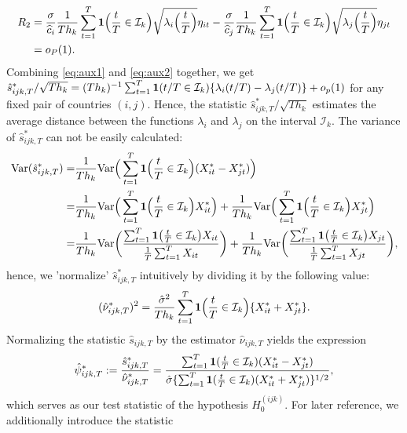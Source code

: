 \documentclass[a4paper,12pt]{article}
\numberwithin{equation}{section}
\begin{document}
{\begin{align}\label{eq:aux2}
R_2& =  \frac{\sigma}{\widehat{c}_i} \frac{1}{Th_k} \sum\limits_{t=1}^T \boldsymbol{1}\Big(\frac{t}{T} \in \mathcal{I}_k\Big) \sqrt{\lambda_i\Big(\frac{t}{T}\Big)} \eta_{it} -\frac{\sigma}{\widehat{c}_j}\frac{1}{Th_k} \sum\limits_{t=1}^T \boldsymbol{1}\Big(\frac{t}{T} \in \mathcal{I}_k\Big)  \sqrt{\lambda_j\Big(\frac{t}{T}\Big)} \eta_{jt}\nonumber\\
& = o_P(1).
\end{align}
Combining \eqref{eq:aux1} and \eqref{eq:aux2} together, we get $\hat{s}^*_{ijk,T}/\sqrt{Th_k} = (Th_k)^{-1} \sum_{t=1}^T \boldsymbol{1}(t/T \in \mathcal{I}_k) \{\lambda_i(t/T) - \lambda_j(t/T)\} + o_p(1)$ for any fixed pair of countries $(i,j)$. Hence, the statistic $\hat{s}^*_{ijk,T}/\sqrt{Th_k}$ estimates the average distance between the functions $\lambda_i$ and $\lambda_j$ on the interval $\mathcal{I}_k$. The variance of $\hat{s}^*_{ijk,T}$ can not be easily calculated:
\begin{align*}
 \textnormal{Var}(\hat{s}^*_{ijk,T})  =&\frac{1}{Th_k} \textnormal{Var} \Big( \sum\limits_{t=1}^T \boldsymbol{1}\Big(\frac{t}{T} \in \mathcal{I}_k\Big) (X_{it}^* - X_{jt}^*) \Big)\\
=&\frac{1}{Th_k} \textnormal{Var} \Big( \sum\limits_{t=1}^T \boldsymbol{1}\Big(\frac{t}{T} \in \mathcal{I}_k\Big) X_{it}^*\Big) + \frac{1}{Th_k} \textnormal{Var} \Big( \sum\limits_{t=1}^T \boldsymbol{1}\Big(\frac{t}{T} \in \mathcal{I}_k\Big) X_{jt}^*\Big)\\
 = &\frac{1}{Th_k} \textnormal{Var} \bigg( \frac{\sum\nolimits_{t=1}^T \boldsymbol{1}\big(\frac{t}{T} \in \mathcal{I}_k\big) X_{it}}{\frac{1}{T}\sum\nolimits_{t=1}^T X_{it}} \bigg) + \frac{1}{Th_k} \textnormal{Var} \bigg( \frac{\sum\nolimits_{t=1}^T \boldsymbol{1}\big(\frac{t}{T} \in \mathcal{I}_k\big) X_{jt}}{\frac{1}{T}\sum\nolimits_{t=1}^T X_{jt}} \bigg),
\end{align*}
hence, we 'normalize' $\hat{s}^*_{ijk,T}$ intuitively by dividing it by the following value:
\[ (\hat{\nu}^*_{ijk,T})^2 = \frac{\hat{\sigma}^2}{Th_k} \sum\limits_{t=1}^T \boldsymbol{1}\Big(\frac{t}{T} \in \mathcal{I}_k\Big) \{ X^*_{it} + X^*_{jt} \}.\]
Normalizing the statistic $\hat{s}_{ijk,T}$ by the estimator $\hat{\nu}_{ijk,T}$ yields the expression 
\begin{equation*}
\hat{\psi}^*_{ijk,T} := \frac{\hat{s}^*_{ijk,T}}{\hat{\nu}^*_{ijk,T}} = \frac{\sum\nolimits_{t=1}^T \boldsymbol{1}(\frac{t}{T} \in \mathcal{I}_k) (X^*_{it} - X^*_{jt})}{ \hat{\sigma}\{ \sum\nolimits_{t=1}^T \boldsymbol{1}(\frac{t}{T} \in \mathcal{I}_k) (X^*_{it} + X^*_{jt}) \}^{1/2}}, 
\end{equation*}
which serves as our test statistic of the hypothesis $H_0^{(ijk)}$. For later reference, we additionally introduce the statistic 
}
\end{document}
